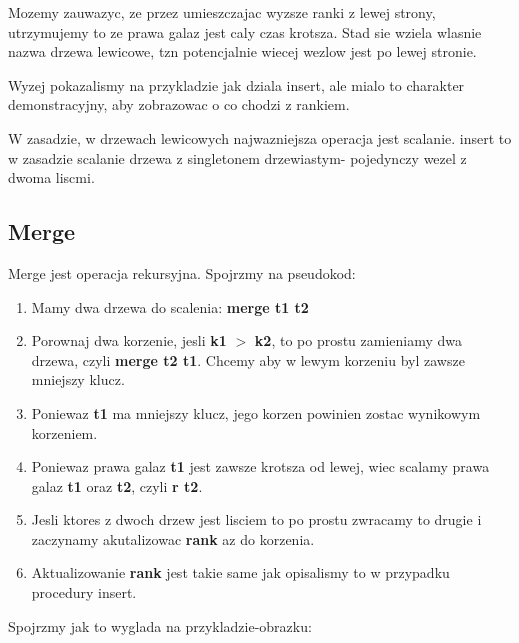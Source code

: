 \documentclass{article}
\begin{document}
Mozemy zauwazyc, ze przez umieszczajac wyzsze ranki z lewej strony, utrzymujemy to ze prawa galaz jest caly czas krotsza. Stad sie wziela wlasnie nazwa drzewa lewicowe, tzn potencjalnie wiecej wezlow jest po lewej stronie.

Wyzej pokazalismy na przykladzie jak dziala insert, ale mialo to charakter demonstracyjny, aby zobrazowac o co chodzi z rankiem.

W zasadzie, w drzewach lewicowych najwazniejsza operacja jest scalanie. insert to w zasadzie scalanie drzewa z singletonem drzewiastym- pojedynczy wezel z dwoma liscmi.

\subsection{Merge}

Merge jest operacja rekursyjna. Spojrzmy na pseudokod:

\begin{tcolorbox}[colback=white!90!blue,colframe=black!35!blue,title=]

    \begin{enumerate}[label=(\arabic*)]
        \item Mamy dwa drzewa do scalenia: \textbf{merge t1 t2}
        \item Porownaj dwa korzenie, jesli \textbf{k1} $>$ \textbf{k2}, to po prostu zamieniamy dwa drzewa, czyli \textbf{merge t2 t1}. Chcemy aby w lewym korzeniu byl zawsze mniejszy klucz.
        \item Poniewaz \textbf{t1} ma mniejszy klucz, jego korzen powinien zostac wynikowym korzeniem.
        \item Poniewaz prawa galaz \textbf{t1} jest zawsze krotsza od lewej, wiec scalamy prawa galaz \textbf{t1} oraz \textbf{t2}, czyli \textbf{r t2}.
        \item Jesli ktores z dwoch drzew jest lisciem to po prostu zwracamy to drugie i zaczynamy akutalizowac \textbf{rank} az do korzenia.
        \item Aktualizowanie \textbf{rank} jest takie same jak opisalismy to w przypadku procedury insert.

    \end{enumerate}

\end{tcolorbox}

\vspace{5cm}


Spojrzmy jak to wyglada na przykladzie-obrazku:
\end{document}
